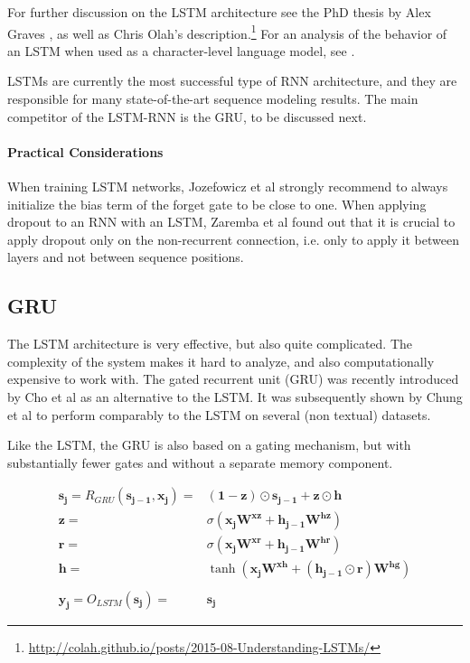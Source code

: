 \documentclass[jair,twoside,11pt,theapa]{article}
\newcommand{\m}[1]{\mathbf{#1}}%
\renewcommand{\shortcite}[0]{\citeyear}
\begin{document}
{For further discussion on the LSTM architecture see the PhD thesis by Alex
Graves \shortcite{graves2008supervised}, as well as
Chris Olah's description.\footnote{\url{http://colah.github.io/posts/2015-08-Understanding-LSTMs/}}  For an analysis of the
behavior of an LSTM when used as a character-level language model, see
\cite{karpathy2015visualizing}.

LSTMs are currently the most successful type of RNN architecture, and they are
responsible for many state-of-the-art sequence modeling results.
The main competitor of the LSTM-RNN is the GRU, to be discussed next.

\paragraph{Practical Considerations}  When training LSTM networks, Jozefowicz et al
\shortcite{jozefowicz2015empirical} strongly recommend to always initialize the bias term
of the forget gate to be close to one.  When applying dropout to an RNN with an
LSTM, Zaremba et al \shortcite{zaremba2014recurrent} found out that it is
crucial to apply dropout only on the non-recurrent connection, i.e. only to
apply it between layers and not between sequence positions.

\subsection{GRU} 
The LSTM architecture is very effective, but also quite complicated.  The
complexity of the system makes it hard to analyze,
and also computationally expensive to work with.
The gated recurrent unit (GRU) was recently introduced by Cho et al
\shortcite{cho2014learning} as an alternative to the LSTM.  It was subsequently
shown by Chung et al \shortcite{chung2014empirical} to perform comparably to the
LSTM on several (non textual) datasets.

Like the LSTM, the GRU is also based on a gating mechanism, but with
substantially fewer gates and without a separate memory component.

\begin{align*}
    \m{s_j} = R_{GRU}(\m{s_{j-1}}, \m{x_j}) =& (\m{1} - \m{z})\odot \m{s_{j-1}} + \m{z}\odot\m{h} \\
    \m{z} =& \sigma(\m{x_j}\m{W^{xz}} + \m{h_{j-1}}\m{W^{hz}}) \\
    \m{r} =& \sigma(\m{x_j}\m{W^{xr}} + \m{h_{j-1}}\m{W^{hr}}) \\
    \m{h} =& \tanh(\m{x_j}\m{W^{xh}} + (\m{h_{j-1}}\odot\m{r})\m{W^{hg}}) \\
    \\
    \m{y_j} = O_{LSTM}(\m{s_j}) =& \m{s_j} 
\end{align*}

}
\end{document}
